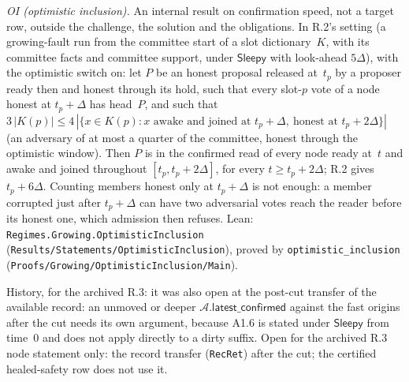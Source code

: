 \documentclass{article}
\newcommand{\AC}{\mathcal A}
\newcommand{\latestConfirmed}{\mathsf{latest\_confirmed}}
\begin{document}
\begin{sloppypar}
\emph{OI (optimistic inclusion).}  An internal result on confirmation speed,
not a target row, outside the challenge, the solution and the obligations.
In R.2's setting (a growing-fault run from the committee start of a slot
dictionary~$K$, with its committee facts and committee support, under
$\mathsf{Sleepy}$ with look-ahead $5\Delta$), with the optimistic switch on:
let $P$ be an honest proposal released at~$t_p$ by a proposer ready then and
honest through its hold, such that every slot-$p$ vote of a node honest at
$t_p+\Delta$ has head~$P$, and such that
$3\,|K(p)|\leq4\,|\{x\in K(p): x\text{ awake and joined at }t_p+\Delta,\ \text{honest at }t_p+2\Delta\}|$
(an adversary of at most a quarter of the committee, honest through the
optimistic window).  Then $P$ is in the confirmed read of every node ready at~$t$
and awake and joined throughout $[t_p,t_p+2\Delta]$, for every
$t\geq t_p+2\Delta$; R.2 gives $t_p+6\Delta$.  Counting members honest only
at $t_p+\Delta$ is not enough: a member corrupted just after $t_p+\Delta$ can
have two adversarial votes reach the reader before its honest one, which
admission then refuses.  Lean: \texttt{Regimes.Growing.OptimisticInclusion}
(\texttt{Results/Statements/OptimisticInclusion}), proved by
\texttt{optimistic\_inclusion} (\texttt{Proofs/Growing/OptimisticInclusion/Main}).
\end{sloppypar}

History, for the archived R.3: it was also open at the post-cut transfer of the available record: an unmoved
or deeper $\AC.\latestConfirmed$ against the fast origins after the cut needs its
own argument, because A1.6 is stated under $\mathsf{Sleepy}$ from time~$0$ and
does not apply directly to a dirty suffix.
Open for the archived R.3 node statement only: the record transfer
(\texttt{RecRet}) after the cut; the certified healed-safety row does not
use it.
\end{document}
